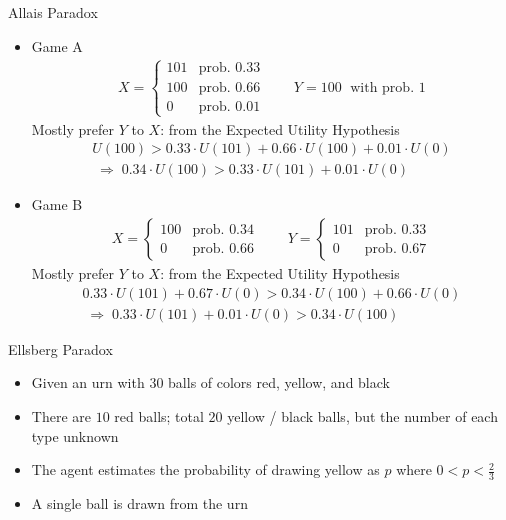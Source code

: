 \documentclass[10pt,handout]{beamer}
\newcommand{\ie}{\;\Longrightarrow\;}
\begin{document}
\begin{frame}{Allais Paradox}
  \begin{itemize}[<+->]\setlength\itemsep{0em}
    \item Game A
      \begin{align*}
        X = \begin{cases}101 & \text{prob. } 0.33\\100 & \text{prob. } 0.66\\ 0 & \text{prob. } 0.01 \end{cases} \qquad
        Y = 100 \;\text{ with prob. } 1
      \end{align*}
      \onslide<+->
      Mostly prefer $Y$ to $X$: from the Expected Utility Hypothesis 
      \onslide<+->
      \begin{multline}
        U(100) > 0.33\cdot U(101) + 0.66\cdot U(100) + 0.01\cdot U(0)\\ \ie 0.34\cdot U(100) > 0.33\cdot U(101) + 0.01\cdot U(0)
      \end{multline}
    \item Game B 
      \begin{align*}
        X = \begin{cases}100 & \text{prob. } 0.34\\ 0 & \text{prob. } 0.66 \end{cases} \qquad
        Y = \begin{cases}101 & \text{prob. } 0.33\\ 0 & \text{prob. } 0.67 \end{cases}
      \end{align*}
      \onslide<+->
      Mostly prefer $Y$ to $X$: from the Expected Utility Hypothesis 
      \onslide<+->
      \begin{multline}
        0.33\cdot U(101) + 0.67\cdot U(0) > 0.34\cdot U(100) + 0.66\cdot U(0)\\ \ie 0.33\cdot U(101) + 0.01\cdot U(0) > 0.34\cdot U(100)
      \end{multline}
  \end{itemize}
\end{frame}

\begin{frame}{Ellsberg Paradox}
  \begin{itemize}[<+->]
    \item Given an urn with $30$ balls of colors red, yellow, and black
    \item There are $10$ red balls; total $20$ yellow / black balls, but the number of each type unknown
    \item The agent estimates the probability of drawing yellow as $p$ where $0 < p < \frac{2}{3}$
    \item A single ball is drawn from the urn
  \end{itemize}
\end{frame}
\end{document}
